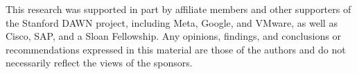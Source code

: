 \begin{acks}
This research was supported in part by affiliate members and other supporters of the Stanford DAWN project, including Meta, Google, and VMware, as well as Cisco, SAP, and a Sloan Fellowship. Any opinions, findings, and conclusions or recommendations expressed in this material are those of the authors and do not necessarily reflect the views of the sponsors.
\end{acks}